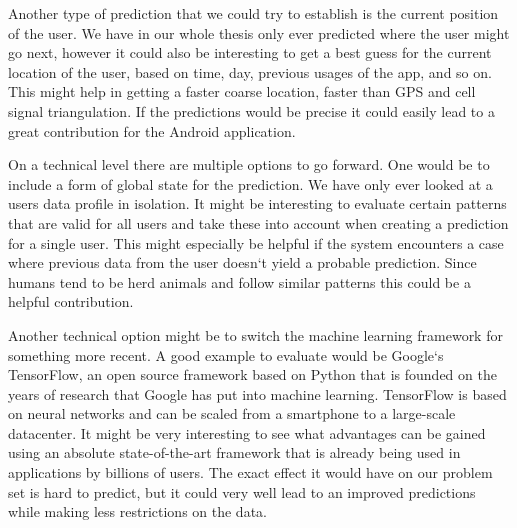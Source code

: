 Another type of prediction that we could try to establish is the current position of the user. We have in our whole thesis only ever predicted where the user might go next, however it could also be interesting to get a best guess for the current location of the user, based on time, day, previous usages of the app, and so on. This might help in getting a faster coarse location, faster than GPS and cell signal triangulation. If the predictions would be precise it could easily lead to a great contribution for the Android application.

On a technical level there are multiple options to go forward. One would be to include a form of global state for the prediction. We have only ever looked at a users data profile in isolation. It might be interesting to evaluate certain patterns that are valid for all users and take these into account when creating a prediction for a single user. This might especially be helpful if the system encounters a case where previous data from the user doesn`t yield a probable prediction. Since humans tend to be herd animals and follow similar patterns this could be a helpful contribution.

Another technical option might be to switch the machine learning framework for something more recent. A good example to evaluate would be Google`s TensorFlow, an open source framework based on Python that is founded on the years of research that Google has put into machine learning. TensorFlow is based on neural networks and can be scaled from a smartphone to a large-scale datacenter. It might be very interesting to see what advantages can be gained using an absolute state-of-the-art framework that is already being used in applications by billions of users. The exact effect it would have on our problem set is hard to predict, but it could very well lead to an improved predictions while making less restrictions on the data. 